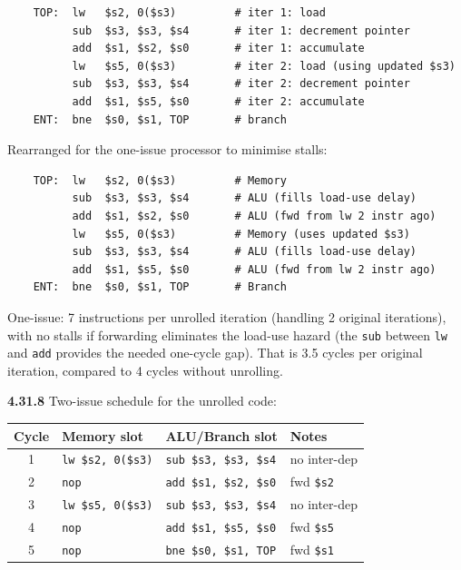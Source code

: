 \begin{verbatim}
    TOP:  lw   $s2, 0($s3)         # iter 1: load
          sub  $s3, $s3, $s4       # iter 1: decrement pointer
          add  $s1, $s2, $s0       # iter 1: accumulate
          lw   $s5, 0($s3)         # iter 2: load (using updated $s3)
          sub  $s3, $s3, $s4       # iter 2: decrement pointer
          add  $s1, $s5, $s0       # iter 2: accumulate
    ENT:  bne  $s0, $s1, TOP       # branch
\end{verbatim}

\noindent Rearranged for the one-issue processor to minimise stalls:

\begin{verbatim}
    TOP:  lw   $s2, 0($s3)         # Memory
          sub  $s3, $s3, $s4       # ALU (fills load-use delay)
          add  $s1, $s2, $s0       # ALU (fwd from lw 2 instr ago)
          lw   $s5, 0($s3)         # Memory (uses updated $s3)
          sub  $s3, $s3, $s4       # ALU (fills load-use delay)
          add  $s1, $s5, $s0       # ALU (fwd from lw 2 instr ago)
    ENT:  bne  $s0, $s1, TOP       # Branch
\end{verbatim}

\noindent One-issue: 7 instructions per unrolled iteration (handling 2
original iterations), with no stalls if forwarding eliminates the load-use
hazard (the \texttt{sub} between \texttt{lw} and \texttt{add} provides the
needed one-cycle gap).  That is 3.5 cycles per original iteration, compared
to 4 cycles without unrolling.

\medskip\noindent\textbf{4.31.8}
Two-issue schedule for the unrolled code:

\begin{center}
\begin{tabular}{clll}
\toprule
\textbf{Cycle} & \textbf{Memory slot} & \textbf{ALU/Branch slot} & \textbf{Notes} \\
\midrule
1 & \texttt{lw \$s2, 0(\$s3)} & \texttt{sub \$s3, \$s3, \$s4} & no inter-dep \\
2 & \texttt{nop} & \texttt{add \$s1, \$s2, \$s0} & fwd \texttt{\$s2} \\
3 & \texttt{lw \$s5, 0(\$s3)} & \texttt{sub \$s3, \$s3, \$s4} & no inter-dep \\
4 & \texttt{nop} & \texttt{add \$s1, \$s5, \$s0} & fwd \texttt{\$s5} \\
5 & \texttt{nop} & \texttt{bne \$s0, \$s1, TOP} & fwd \texttt{\$s1} \\
\bottomrule
\end{tabular}
\end{center}

